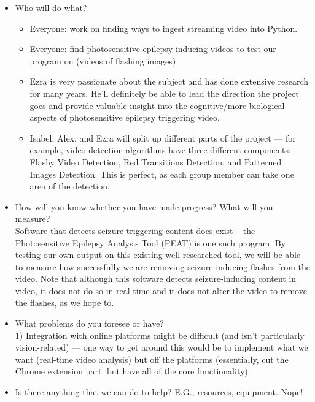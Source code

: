 \begin{itemize}
\item Who will do what?
\begin{itemize}
    \item Everyone: work on finding ways to ingest streaming video into Python.
    \item Everyone: find photosensitive epilepsy-inducing videos to test our program on (videos of flashing images)
    \item Ezra is very passionate about the subject and has done extensive research for many years. He'll definitely be able to lead the direction the project goes and provide valuable insight into the cognitive/more biological aspects of photosensitive epilepsy triggering video.
    \item Isabel, Alex, and Ezra will split up different parts of the project --- for example, video detection algorithms have three different components: Flashy Video Detection, Red Transitions Detection, and Patterned Images Detection. This is perfect, as each group member can take one area of the detection.
\end{itemize}


\item How will you know whether you have made progress? What will you measure?\\
Software that detects seizure-triggering content does exist -- the Photosensitive Epilepsy Analysis Tool (PEAT) is one such program. By testing our own output on this existing well-researched tool, we will be able to measure how successfully we are removing seizure-inducing flashes from the video. Note that although this software detects seizure-inducing content in video, it does not do so in real-time and it does not alter the video to remove the flashes, as we hope to.
\item What problems do you foresee or have? \\
1) Integration with online platforms might be difficult (and isn't particularly vision-related) --- one way to get around this would be to implement what we want (real-time video analysis) but off the platforms (essentially, cut the Chrome extension part, but have all of the core functionality)
\item Is there anything that we can do to help? E.G., resources, equipment.
Nope!
\end{itemize}


